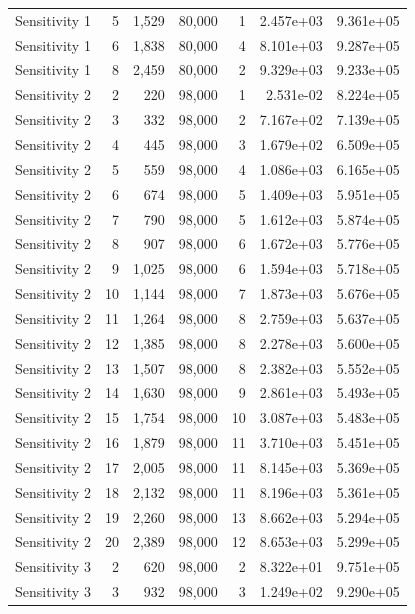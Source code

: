 \begin{table}
\begin{tabular}{lrrrrrr}
 Sensitivity 1 & 5 & 1,529 &  80,000 &   1 & 2.457e+03 & 9.361e+05 \\
 Sensitivity 1 & 6 & 1,838 &  80,000 &   4 & 8.101e+03 & 9.287e+05 \\
 Sensitivity 1 & 8 & 2,459 &  80,000 &   2 & 9.329e+03 & 9.233e+05 \\
 Sensitivity 2 & 2 & 220 &  98,000 &   1 & 2.531e-02 & 8.224e+05 \\
 Sensitivity 2 & 3 & 332 &  98,000 &   2 & 7.167e+02 & 7.139e+05 \\
 Sensitivity 2 & 4 & 445 &  98,000 &   3 & 1.679e+02 & 6.509e+05 \\
 Sensitivity 2 & 5 & 559 &  98,000 &   4 & 1.086e+03 & 6.165e+05 \\
 Sensitivity 2 & 6 & 674 &  98,000 &   5 & 1.409e+03 & 5.951e+05 \\
 Sensitivity 2 & 7 & 790 &  98,000 &   5 & 1.612e+03 & 5.874e+05 \\
 Sensitivity 2 & 8 & 907 &  98,000 &   6 & 1.672e+03 & 5.776e+05 \\
 Sensitivity 2 & 9 & 1,025 &  98,000 &   6 & 1.594e+03 & 5.718e+05 \\
 Sensitivity 2 & 10 & 1,144 &  98,000 &   7 & 1.873e+03 & 5.676e+05 \\
 Sensitivity 2 & 11 & 1,264 &  98,000 &   8 & 2.759e+03 & 5.637e+05 \\
 Sensitivity 2 & 12 & 1,385 &  98,000 &   8 & 2.278e+03 & 5.600e+05 \\
 Sensitivity 2 & 13 & 1,507 &  98,000 &   8 & 2.382e+03 & 5.552e+05 \\
 Sensitivity 2 & 14 & 1,630 &  98,000 &   9 & 2.861e+03 & 5.493e+05 \\
 Sensitivity 2 & 15 & 1,754 &  98,000 &   10 & 3.087e+03 & 5.483e+05 \\
 Sensitivity 2 & 16 & 1,879 &  98,000 &   11 & 3.710e+03 & 5.451e+05 \\
 Sensitivity 2 & 17 & 2,005 &  98,000 &   11 & 8.145e+03 & 5.369e+05 \\
 Sensitivity 2 & 18 & 2,132 &  98,000 &   11 & 8.196e+03 & 5.361e+05 \\
 Sensitivity 2 & 19 & 2,260 &  98,000 &   13 & 8.662e+03 & 5.294e+05 \\
 Sensitivity 2 & 20 & 2,389 &  98,000 &   12 & 8.653e+03 & 5.299e+05 \\
 Sensitivity 3 & 2 & 620 &  98,000 &   2 & 8.322e+01 & 9.751e+05 \\
 Sensitivity 3 & 3 & 932 &  98,000 &   3 & 1.249e+02 & 9.290e+05 \\

\end{tabular}
\end{table}

